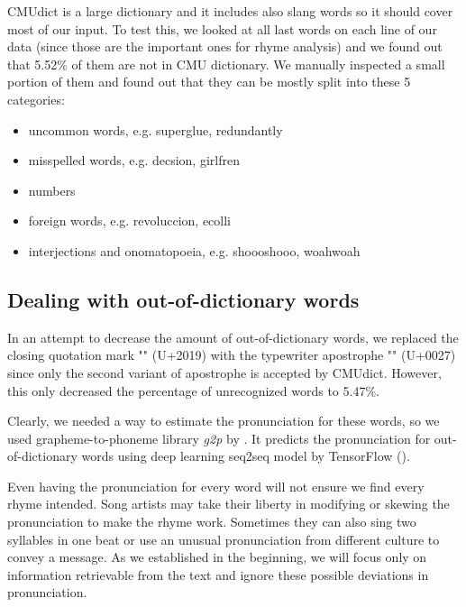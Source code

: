 CMUdict is a large dictionary and it includes also slang words so it should cover most of our input. To test this, we looked at all last words on each line of our data (since those are the important ones for rhyme analysis) and we found out that 5.52\% of them are not in CMU dictionary. We manually inspected a small portion of them and found out that they can be mostly split into these 5 categories:

\begin{itemize}
	\item uncommon words, e.g. superglue, redundantly
	\item misspelled words, e.g. decsion, girlfren
	\item numbers
	\item foreign words, e.g. revoluccion, ecolli
	\item interjections and onomatopoeia, e.g. shoooshooo, woahwoah
\end{itemize}

\subsection{Dealing with out-of-dictionary words}
In an attempt to decrease the amount of out-of-dictionary words, we replaced the closing quotation mark "" (U+2019) with the typewriter apostrophe "\texttt{\selectfont{}}"
 (U+0027) since only the second variant of apostrophe is accepted by CMUdict. However, this only decreased the percentage of unrecognized words to 5.47\%.

Clearly, we needed a way to estimate the pronunciation for these words, so we used grapheme-to-phoneme library \textit{g2p} by \cite{g2pE2019}. It predicts the pronunciation for out-of-dictionary words using deep learning seq2seq model by TensorFlow (\cite{tensorflow2015-whitepaper}).

Even having the pronunciation for every word will not ensure we find every rhyme intended. Song artists may take their liberty in modifying or skewing the pronunciation to make the rhyme work. Sometimes they can also sing two syllables in one beat or use an unusual pronunciation from different culture to convey a message. As we established in the beginning, we will focus only on information retrievable from the text and ignore these possible deviations in pronunciation.


